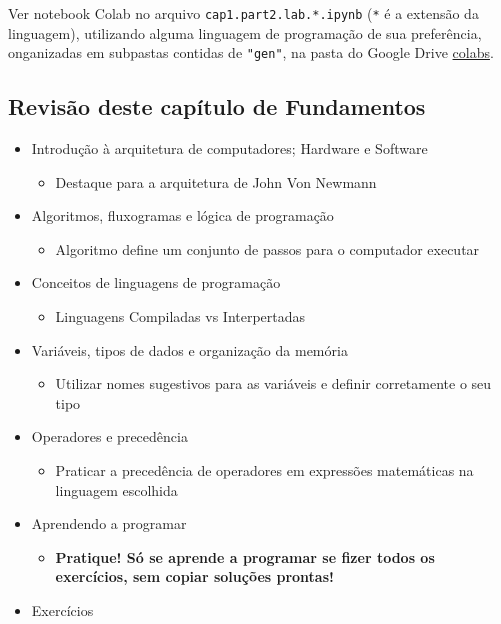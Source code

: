 \documentclass[12pt,a4paper]{article}
\providecommand{\tightlist}{%
      \setlength{\itemsep}{0pt}\setlength{\parskip}{0pt}}
\begin{document}
    Ver notebook Colab no arquivo \texttt{cap1.part2.lab.*.ipynb}
(\texttt{*} é a extensão da linguagem), utilizando alguma linguagem de
programação de sua preferência, onganizadas em subpastas contidas de
\texttt{"gen"}, na pasta do Google Drive
\href{https://drive.google.com/drive/folders/1YlFwv8XYN7PYYf-HwDMlkxzbmXzJw9cM?usp=sharing}{colabs}.

    \hypertarget{revisuxe3o-deste-capuxedtulo-de-fundamentos}{%
\subsection{Revisão deste capítulo de
Fundamentos}\label{revisuxe3o-deste-capuxedtulo-de-fundamentos}}

\begin{itemize}
\tightlist
\item
  Introdução à arquitetura de computadores; Hardware e Software

  \begin{itemize}
  \tightlist
  \item
    Destaque para a arquitetura de John Von Newmann
  \end{itemize}
\item
  Algoritmos, fluxogramas e lógica de programação

  \begin{itemize}
  \tightlist
  \item
    Algoritmo define um conjunto de passos para o computador executar
  \end{itemize}
\item
  Conceitos de linguagens de programação

  \begin{itemize}
  \tightlist
  \item
    Linguagens Compiladas vs Interpertadas
  \end{itemize}
\item
  Variáveis, tipos de dados e organização da memória

  \begin{itemize}
  \tightlist
  \item
    Utilizar nomes sugestivos para as variáveis e definir corretamente o
    seu tipo
  \end{itemize}
\item
  Operadores e precedência

  \begin{itemize}
  \tightlist
  \item
    Praticar a precedência de operadores em expressões matemáticas na
    linguagem escolhida
  \end{itemize}
\item
  Aprendendo a programar

  \begin{itemize}
  \tightlist
  \item
    \textbf{Pratique! Só se aprende a programar se fizer todos os
    exercícios, sem copiar soluções prontas!}
  \end{itemize}
\item
  Exercícios
\end{itemize}
\end{document}
